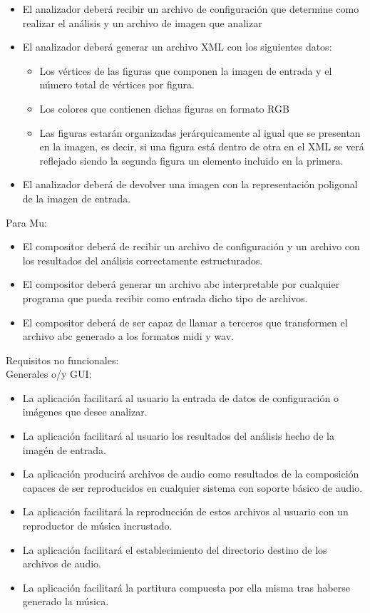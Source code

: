  \begin{itemize}
	\item El analizador deberá recibir un archivo de configuración que determine como realizar el análisis y un archivo de imagen que analizar
	\item El analizador deberá generar un archivo XML con los siguientes datos:
	\begin{itemize}
		\item Los vértices de las figuras que componen la imagen de entrada y el número total de vértices por figura.
		\item Los  colores que contienen dichas figuras en formato RGB
		\item Las figuras estarán organizadas jerárquicamente al igual que se presentan en la imagen, es decir, si una figura está dentro de otra en el XML se verá reflejado siendo la segunda figura un elemento incluido en la primera.
	\end{itemize}
	\item El analizador deberá de devolver una imagen con la representación poligonal de la imagen de entrada.
 \end{itemize}
 Para Mu:
 \begin{itemize}
	\item El compositor deberá de recibir un archivo de configuración y un archivo con los resultados del análisis correctamente estructurados.
	\item El compositor deberá generar un archivo abc interpretable por cualquier programa que pueda recibir como entrada dicho tipo de archivos.
	\item El compositor deberá de ser capaz de llamar a terceros que transformen el archivo abc generado a los formatos midi y wav.
 \end{itemize}
Requisitos no funcionales:
\\Generales o/y GUI:
\begin{itemize}
	\item La aplicación facilitará al usuario la entrada de datos de configuración o imágenes que desee analizar.
	\item La aplicación facilitará al usuario los resultados del análisis hecho de la imagén de entrada.
	\item La aplicación producirá archivos de audio como resultados de la composición capaces de ser reproducidos en cualquier sistema con soporte básico de audio.
	\item La aplicación facilitará la reproducción de estos archivos al usuario con un reproductor de música incrustado.
	\item La aplicación facilitará el establecimiento del directorio destino de los archivos de audio.
	\item La aplicación facilitará la partitura compuesta por ella misma tras haberse generado la música.
\end{itemize}
